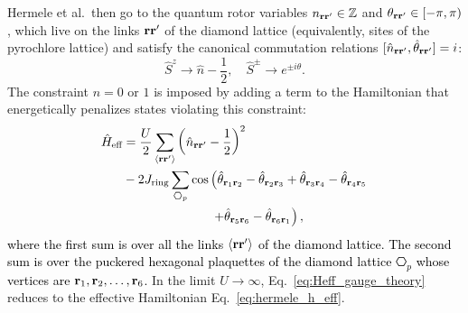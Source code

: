 \documentclass[twocolumn,superscriptaddress,amsmath,amssymb,aps,prx,nofootinbib]{revtex4-2}
\newcommand{\newtext}[1]{\textcolor{black}{#1}}
\begin{document}
Hermele et al.~then go to the quantum rotor variables $n_{\vb{r}\vb{r}'} \in \mathbb{Z}$ and $\theta_{\vb{r}\vb{r}'} \in [-\pi,\pi)$, which live on the links $\vb{r}\vb{r}'$ of the diamond lattice (equivalently, sites of the pyrochlore lattice) and satisfy the canonical commutation relations $[\hat{n}_{\vb{r}\vb{r}'} ,\hat{\theta}_{\vb{r}\vb{r}'} ] = i$:
\begin{equation} \label{eq:rotor_mapping}
  \hat{S}^z \rightarrow \hat{n} - \frac{1}{2},  \quad  \hat{S}^\pm  \rightarrow e^{ \pm i\hat{\theta}}.
\end{equation}
The constraint $n = 0 \text{ or }1$ is imposed by adding a term to the Hamiltonian that energetically penalizes states violating this constraint: 
\newtext{
\begin{align} \label{eq:Heff_gauge_theory}
  \hat{H}_{\text{eff}} & =   \frac{U}{2} \sum_{\langle \vb{r}\vb{r}' \rangle} \left( \hat{n}_{\vb{r}\vb{r'}} -\frac{1}{2} \right)^2 \\ \nonumber
&  - 2 J_{\text{ring}} \sum_{\hexagon_p} \cos\left(\hat{\theta}_{\vb{r}_1\vb{r}_2} -\hat{\theta}_{\vb{r}_2 \vb{r}_3}+\hat{\theta}_{\vb{r}_3\vb{r}_4}- \hat{\theta}_{\vb{r}_4\vb{r}_5}\right.\\
& \quad \quad \quad \quad \quad \quad \quad \left.+\hat{\theta}_{\vb{r}_5\vb{r}_6}-\hat{\theta}_{\vb{r}_6\vb{r}_1}\right),
\end{align}
where the first sum is over all the links $\langle\vb{r}\vb{r}'\rangle$ of the diamond lattice. The second sum is over the puckered hexagonal plaquettes of the diamond lattice $\hexagon_p$  whose vertices are $\vb{r}_1, \vb{r}_2, \ldots ,\vb{r}_6$.}
In the limit $U \rightarrow \infty$, Eq.~\eqref{eq:Heff_gauge_theory} reduces to the effective Hamiltonian Eq.~\eqref{eq:hermele_h_eff}.
\end{document}
